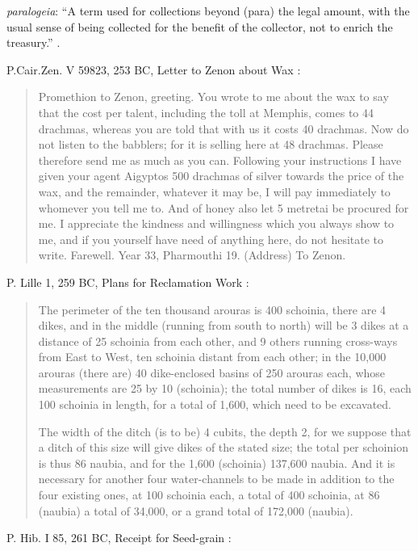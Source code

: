 \documentclass{article}
\begin{document}
 {\em paralogeia}: ``A term used for collections beyond (para) the legal amount, with the
usual sense of being collected for the benefit of the collector, not to enrich the treasury.'' \cite[p.~160]{hellenistic2004}.

P.Cair.Zen. V 59823, 253 BC, Letter to Zenon about Wax \cite[p.~161]{hellenistic2004}:

\begin{quote}
Promethion to Zenon, greeting. You wrote to me about the wax to say that
the cost per talent, including the toll at Memphis, comes to 44 drachmas,
whereas you are told that with us it costs 40 drachmas. Now do not listen to
the babblers; for it is selling here at 48 drachmas. Please therefore send me
as much as you can. Following your instructions I have given your agent
Aigyptos 500 drachmas of silver towards the price of the wax, and the
remainder, whatever it may be, I will pay immediately to whomever you tell
me to. And of honey also let 5 metretai be procured for me. I appreciate the
kindness and willingness which you always show to me, and if you yourself
have need of anything here, do not hesitate to write. Farewell. Year 33,
Pharmouthi 19. (Address) To Zenon.
\end{quote}

P. Lille 1, 259 BC, Plans for Reclamation Work \cite[pp.~170--171]{hellenistic2004}:

\begin{quote}
The perimeter of the ten thousand arouras is 400 schoinia, there are 4 dikes,
and in the middle (running from south to north) will be 3 dikes at a distance
of 25 schoinia from each other, and 9 others running cross-ways from East to
West, ten schoinia distant from each other; in the 10,000 arouras (there are)
40 dike-enclosed basins of 250 arouras each, whose measurements are 25 by
10 (schoinia); the total number of dikes is 16, each 100 schoinia in length, for
a total of 1,600, which need to be excavated.

The width of the ditch (is to be) 4 cubits, the depth 2, for we suppose that
a ditch of this size will give dikes of the stated size; the total per schoinion is
thus 86 naubia, and for the 1,600 (schoinia) 137,600 naubia. And it is necessary
for another four water-channels to be made in addition to the four existing
ones, at 100 schoinia each, a total of 400 schoinia, at 86 (naubia) a total
of 34,000, or a grand total of 172,000 (naubia).
\end{quote}

P. Hib. I 85, 261 BC, Receipt for Seed-grain \cite[p.~173]{hellenistic2004}:
\end{document}
